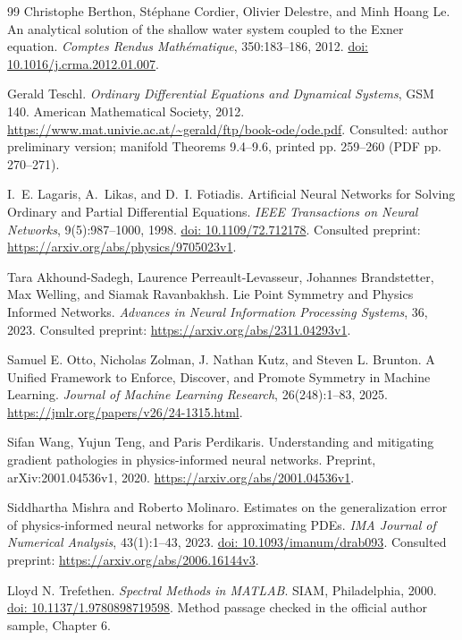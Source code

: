 \documentclass[12pt,a4paper,oneside]{report}
\numberwithin{equation}{chapter}
\theoremstyle{remark}\newtheorem{remark}[theorem]{Remark}
\newcommand{\doi}[1]{\href{https://doi.org/#1}{doi: #1}}
\begin{document}
\begin{thebibliography}{99}
Christophe Berthon, St\'ephane Cordier, Olivier Delestre, and Minh Hoang Le. An analytical solution of the shallow water system coupled to the Exner equation. \emph{Comptes Rendus Math\'ematique}, 350:183--186, 2012. \doi{10.1016/j.crma.2012.01.007}.

Gerald Teschl. \emph{Ordinary Differential Equations and Dynamical Systems}, GSM 140. American Mathematical Society, 2012. \url{https://www.mat.univie.ac.at/~gerald/ftp/book-ode/ode.pdf}. Consulted: author preliminary version; manifold Theorems 9.4--9.6, printed pp. 259--260 (PDF pp. 270--271).

I.~E. Lagaris, A.~Likas, and D.~I. Fotiadis. Artificial Neural Networks for Solving Ordinary and Partial Differential Equations. \emph{IEEE Transactions on Neural Networks}, 9(5):987--1000, 1998. \doi{10.1109/72.712178}. Consulted preprint: \url{https://arxiv.org/abs/physics/9705023v1}.

Tara Akhound-Sadegh, Laurence Perreault-Levasseur, Johannes Brandstetter, Max Welling, and Siamak Ravanbakhsh. Lie Point Symmetry and Physics Informed Networks. \emph{Advances in Neural Information Processing Systems}, 36, 2023. Consulted preprint: \url{https://arxiv.org/abs/2311.04293v1}.

Samuel E. Otto, Nicholas Zolman, J. Nathan Kutz, and Steven L. Brunton. A Unified Framework to Enforce, Discover, and Promote Symmetry in Machine Learning. \emph{Journal of Machine Learning Research}, 26(248):1--83, 2025. \url{https://jmlr.org/papers/v26/24-1315.html}.

Sifan Wang, Yujun Teng, and Paris Perdikaris. Understanding and mitigating
gradient pathologies in physics-informed neural networks. Preprint,
arXiv:2001.04536v1, 2020. \url{https://arxiv.org/abs/2001.04536v1}.

Siddhartha Mishra and Roberto Molinaro. Estimates on the generalization error of physics-informed neural networks for approximating PDEs. \emph{IMA Journal of Numerical Analysis}, 43(1):1--43, 2023. \doi{10.1093/imanum/drab093}. Consulted preprint: \url{https://arxiv.org/abs/2006.16144v3}.

Lloyd N. Trefethen. \emph{Spectral Methods in MATLAB}. SIAM, Philadelphia, 2000. \doi{10.1137/1.9780898719598}. Method passage checked in the official author sample, Chapter 6.


\end{thebibliography}
\end{document}
